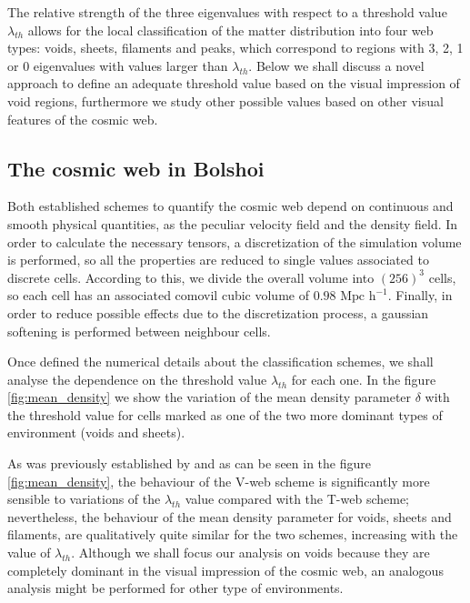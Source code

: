 \documentclass[usenatbib]{latex/mn2e}
\begin{document}
The relative strength of the three eigenvalues with respect to a threshold
value $\lambda_{th}$ allows for the local classification of the matter 
distribution into four web types: voids, sheets, filaments and peaks, 
which correspond to regions with 3, 2, 1 or 0 eigenvalues with values 
larger than $\lambda_{th}$. Below we shall discuss a novel approach to 
define an adequate threshold value based on the visual impression of void
regions, furthermore we study other possible values based on other visual
features of the cosmic web.



\subsection{The cosmic web in Bolshoi}
\label{subsec:web_in_simulations}



Both established schemes to quantify the cosmic web depend on continuous 
and smooth physical quantities, as the peculiar velocity field and the 
density field. In order to calculate the necessary tensors, a discretization
of the simulation volume is performed, so all the properties are reduced 
to single values associated to discrete cells. According to this, we divide 
the overall volume into $(256)^3$ cells, so each cell has an associated 
comovil cubic volume of $0.98 \mbox{ Mpc h}^{-1}$. Finally, in order to 
reduce possible effects due to the discretization process, a gaussian 
softening is performed between neighbour cells.



Once defined the numerical details about the classification schemes, we 
shall analyse the dependence on the threshold value $\lambda_{th}$ for each 
one. In the figure \ref{fig:mean_density} we show the variation of the mean 
density parameter $\delta$ with the threshold value for cells marked as one 
of the two more dominant types of environment (voids and sheets).



As was previously established by  and as 
can be seen in the figure \ref{fig:mean_density}, the behaviour of the 
V-web scheme is significantly more sensible to variations of the 
$\lambda_{th}$ value compared with the T-web scheme; nevertheless, the 
behaviour of the mean density parameter for voids, sheets and filaments, 
are qualitatively quite similar for the two schemes, increasing with the 
value of $\lambda_{th}$. Although we shall focus our analysis on voids 
because they are completely dominant in the visual impression of the 
cosmic web, an analogous analysis might be performed for other type of 
environments.
\end{document}
